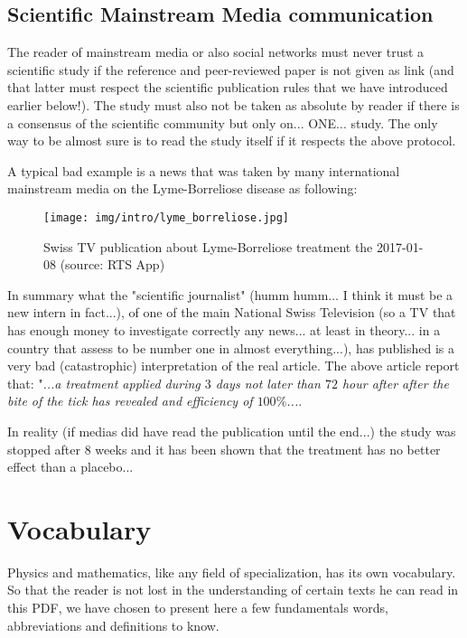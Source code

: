 	\pagebreak
	\subsection{Scientific Mainstream Media communication}
	The reader of mainstream media or also social networks must never trust a scientific study if the reference and peer-reviewed paper is not given as link (and that latter must respect the scientific publication rules that we have introduced earlier below!). The study must also not be taken as absolute by reader if there is a consensus of the scientific community but only on... ONE... study. The only way to be almost sure is to read the study itself if it respects the above protocol.
	
	A typical bad example is a news that was taken by many international mainstream media on the Lyme-Borreliose disease as following:
	\begin{figure}[H]
		\centering
		\texttt{[image: img/intro/lyme\_borreliose.jpg]}
		\caption[Swiss TV publication about Lyme-Borreliose treatment]{Swiss TV publication about Lyme-Borreliose treatment the 2017-01-08 (source: RTS App)}
	\end{figure}
	In summary what the "scientific journalist" (humm humm... I think it must be a new intern in fact...), of one of the main National Swiss Television (so a TV that has enough money to investigate correctly any news... at least in theory... in a country that assess to be number one in almost everything...), has published is a very bad (catastrophic) interpretation of the real article. The above article report that: "\textit{...a treatment applied during $3$ days not later than $72$ hour after after the bite of the tick has revealed and efficiency of $100\%$...}.
	
	In reality (if medias did have read the publication until the end...) the study was stopped after $8$ weeks and it has been shown that the treatment has no better effect than a placebo...

	\newpage
	\thispagestyle{empty}
	\mbox{}
	\section{Vocabulary}
	Physics and mathematics, like any field of specialization, has its own vocabulary. So that the reader is not lost in the understanding of certain texts he can read in this PDF, we have chosen to present here a few fundamentals words, abbreviations and definitions to know.
	
